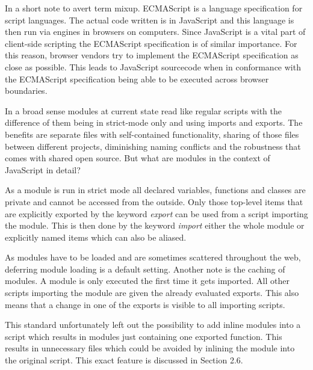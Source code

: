 In a short note to avert term mixup. ECMAScript is a language specification for script languages. The actual code written is in JavaScript and this language is then run via engines in browsers on computers. Since JavaScript is a vital part of client-side scripting the ECMAScript specification is of similar importance. For this reason, browser vendors try to implement the ECMAScript specification as close as possible. This leads to JavaScript sourcecode when in conformance with the ECMAScript specification being able to be executed across browser boundaries.

In a broad sense modules at current state read like regular scripts with the difference of them being in strict-mode only and using imports and exports. The benefits are separate files with self-contained functionality, sharing of those files between different projects, diminishing naming conflicts and the robustness that comes with shared open source. But what are modules in the context of JavaScript in detail?

As a module is run in strict mode all declared variables, functions and classes are private and cannot be accessed from the outside. Only those top-level items that are explicitly exported by the keyword \emph{export} can be used from a script importing the module. This is then done by the keyword \emph{import} either the whole module or explicitly named items which can also be aliased.

As modules have to be loaded and are sometimes scattered throughout the web, deferring module loading is a default setting. Another note is the caching of modules. A module is only executed the first time it gets imported. All other scripts importing the module are given the already evaluated exports. This also means that a change in one of the exports is visible to all importing scripts.

This standard unfortunately left out the possibility to add inline modules into a script which results in modules just containing one exported function. This results in unnecessary files which could be avoided by inlining the module into the original script. This exact feature is discussed in Section 2.6.

